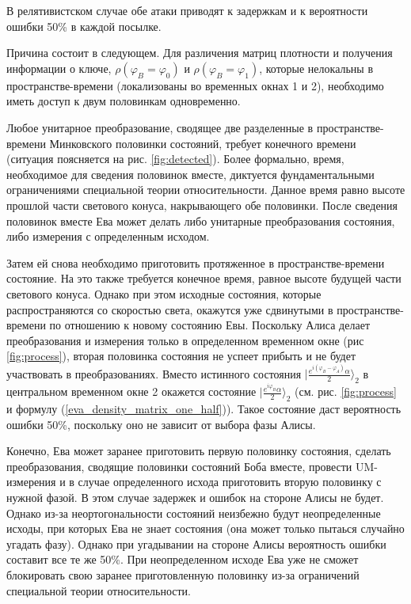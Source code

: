 В релятивистском случае обе атаки приводят к задержкам и к вероятности ошибки 50\% в каждой посылке.

Причина состоит в следующем. Для различения матриц плотности и получения информации о ключе, $\rho(\varphi_B = \varphi_0)$ и $\rho(\varphi_B = \varphi_1)$, которые нелокальны в пространстве-времени (локализованы во временных окнах 1 и 2), необходимо иметь доступ к двум половинкам одновременно.

Любое унитарное преобразование, сводящее две разделенные в пространстве-времени Минковского половинки состояний, требует конечного времени (ситуация поясняется на рис. \ref{fig:detected}). 
Более формально, время, необходимое для сведения половинок вместе, диктуется фундаментальными ограничениями специальной теории относительности.
Данное время равно высоте прошлой части светового конуса, накрывающего обе половинки. 
После сведения половинок вместе Ева может делать либо унитарные преобразования состояния, либо измерения с определенным исходом.

Затем ей снова необходимо приготовить протяженное в пространстве-времени состояние. На это также требуется конечное время, равное высоте будущей части светового конуса. 
Однако при этом исходные состояния, которые распространяются со скоростью света, окажутся уже сдвинутыми в пространстве-времени по отношению к новому состоянию Евы.
Поскольку Алиса делает преобразования и измерения только в определенном временном окне (рис \ref{fig:process}), вторая половинка состояния не успеет прибыть и не будет участвовать в преобразованиях. Вместо истинного состояния $| \frac{e^{i(\varphi_B - \varphi_A)}\alpha}{2}\rangle_2$ в центральном временном окне 2 окажется состояние $| \frac{e^{i\varphi_B}\alpha}{2} \rangle_2$ (см. рис. \ref{fig:process} и формулу (\ref{eva_density_matrix_one_half})). 
Такое состояние даст вероятность ошибки 50\%, поскольку оно не зависит от выбора фазы Алисы.

Конечно, Ева может заранее приготовить первую половинку состояния, сделать преобразования, сводящие половинки состояний Боба вместе, провести UM-измерения и в случае определенного исхода приготовить вторую половинку с нужной фазой. В этом случае задержек и ошибок на стороне Алисы не будет. Однако из-за неортогональности состояний неизбежно будут неопределенные исходы, при которых Ева не знает состояния (она может только пытаься случайно угадать фазу). Однако при угадывании на стороне Алисы вероятность ошибки составит все те же 50\%. При неопределенном исходе Ева уже не сможет блокировать свою заранее приготовленную половинку из-за ограничений специальной теории относительности.

